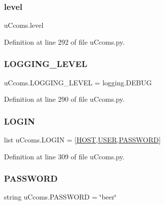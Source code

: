 \subsubsection{\texorpdfstring{level}{level}}
{\footnotesize\ttfamily u\+Ccoms.\+level}



Definition at line 292 of file u\+Ccoms.\+py.

\mbox{\label{namespaceu_ccoms_a9439a087a2f706f59e711b24105a3ef1}} 
\subsubsection{\texorpdfstring{LOGGING\_LEVEL}{LOGGING\_LEVEL}}
{\footnotesize\ttfamily u\+Ccoms.\+L\+O\+G\+G\+I\+N\+G\+\_\+\+L\+E\+V\+EL = logging.\+D\+E\+B\+UG}



Definition at line 290 of file u\+Ccoms.\+py.

\mbox{\label{namespaceu_ccoms_ae2aa412a23b414e90847ae138987f3a0}} 
\subsubsection{\texorpdfstring{LOGIN}{LOGIN}}
{\footnotesize\ttfamily list u\+Ccoms.\+L\+O\+G\+IN = \mbox{[}\mbox{\hyperlink{namespaceu_ccoms_a90271686cb28137e4120a2fe5fff5ff2}{H\+O\+ST}},\mbox{\hyperlink{namespaceu_ccoms_a300efdcbe8f88bd91a7d1585d7546eed}{U\+S\+ER}},\mbox{\hyperlink{namespaceu_ccoms_ae6f9b8fdfb8f30368cab1ce40c927f81}{P\+A\+S\+S\+W\+O\+RD}}\mbox{]}}



Definition at line 309 of file u\+Ccoms.\+py.

\mbox{\label{namespaceu_ccoms_ae6f9b8fdfb8f30368cab1ce40c927f81}} 
\subsubsection{\texorpdfstring{PASSWORD}{PASSWORD}}
{\footnotesize\ttfamily string u\+Ccoms.\+P\+A\+S\+S\+W\+O\+RD = \char`\"{}beer\char`\"{}}



